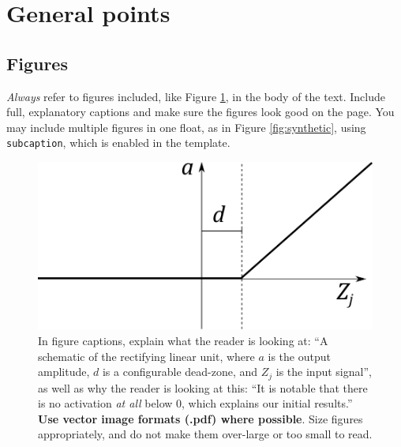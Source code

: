 \documentclass{l4proj}
\begin{document}
\section{General points}
\subsection{Figures}
\emph{Always} refer to figures included, like Figure \ref{fig:relu}, in the body of the text. Include full, explanatory captions and make sure the figures look good on the page.
You may include multiple figures in one float, as in Figure \ref{fig:synthetic}, using \texttt{subcaption}, which is enabled in the template.



\begin{figure}
    \centering
    \includegraphics[width=0.5\linewidth]{images/relu.pdf}    

    \caption{In figure captions, explain what the reader is looking at: ``A schematic of the rectifying linear unit, where $a$ is the output amplitude,
    $d$ is a configurable dead-zone, and $Z_j$ is the input signal'', as well as why the reader is looking at this: 
    ``It is notable that there is no activation \emph{at all} below 0, which explains our initial results.'' 
    \textbf{Use vector image formats (.pdf) where possible}. Size figures appropriately, and do not make them over-large or too small to read.
    }
    \label{fig:relu} 
\end{figure}
\end{document}
